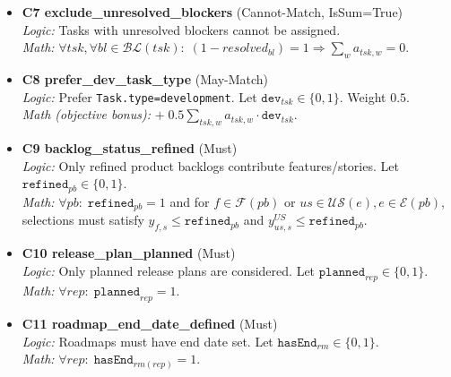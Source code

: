\documentclass[11pt,a4paper]{article}
\begin{document}
\begin{itemize}[leftmargin=2em]
  \item \textbf{C7 \; exclude\_unresolved\_blockers} (Cannot-Match, IsSum=True)\\
  \emph{Logic:} Tasks with unresolved blockers cannot be assigned.\\
  \emph{Math:} $\forall tsk,\forall bl\in\mathcal{B\!L}(tsk):\; (1-resolved_{bl})=1 \Rightarrow \sum_{w} a_{tsk,w}=0$.

  \item \textbf{C8 \; prefer\_dev\_task\_type} (May-Match)\\
  \emph{Logic:} Prefer \texttt{Task.type=development}. Let $\texttt{dev}_{tsk}\in\{0,1\}$. Weight $0.5$.\\
  \emph{Math (objective bonus):} $+\;0.5\sum_{tsk,w} a_{tsk,w}\cdot \texttt{dev}_{tsk}$.

  \item \textbf{C9 \; backlog\_status\_refined} (Must)\\
  \emph{Logic:} Only refined product backlogs contribute features/stories. Let $\texttt{refined}_{pb}\in\{0,1\}$.\\
  \emph{Math:} $\forall pb:\; \texttt{refined}_{pb}=1$ and for $f\in\mathcal{F}(pb)$ or $us\in\mathcal{U\!S}(e), e\in\mathcal{E}(pb)$, selections must satisfy $y_{f,s}\le \texttt{refined}_{pb}$ and $y^{US}_{us,s}\le \texttt{refined}_{pb}$.

  \item \textbf{C10 \; release\_plan\_planned} (Must)\\
  \emph{Logic:} Only planned release plans are considered. Let $\texttt{planned}_{rep}\in\{0,1\}$.\\
  \emph{Math:} $\forall rep:\; \texttt{planned}_{rep}=1$.

  \item \textbf{C11 \; roadmap\_end\_date\_defined} (Must)\\
  \emph{Logic:} Roadmaps must have end date set. Let $\texttt{hasEnd}_{rm}\in\{0,1\}$.\\
  \emph{Math:} $\forall rep:\; \texttt{hasEnd}_{rm(rep)}=1$.
\end{itemize}
\end{document}
